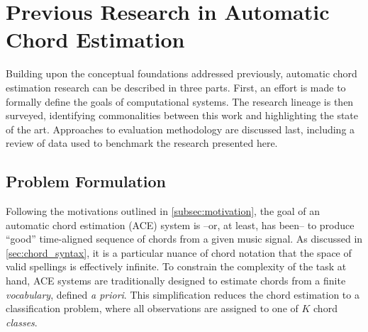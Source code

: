 

\section{Previous Research in Automatic Chord Estimation}
\label{sec:background}

Building upon the conceptual foundations addressed previously, automatic chord estimation research can be described in three parts.
First, an effort is made to formally define the goals of computational systems.
The research lineage is then surveyed, identifying commonalities between this work and highlighting the state of the art.
Approaches to evaluation methodology are discussed last, including a review of data used to benchmark the research presented here.


\subsection{Problem Formulation}
\label{subsec:problem_formulation}

Following the motivations outlined in \ref{subsec:motivation}, the goal of an automatic chord estimation (ACE) system is --or, at least, has been-- to produce ``good'' time-aligned sequence of chords from a given music signal.
As discussed in \ref{sec:chord_syntax}, it is a particular nuance of chord notation that the space of valid spellings is effectively infinite.
To constrain the complexity of the task at hand, ACE systems are traditionally designed to estimate chords from a finite \emph{vocabulary}, defined \emph{a priori}.
This simplification reduces the chord estimation to a classification problem, where all observations are assigned to one of $K$ chord \emph{classes}.


